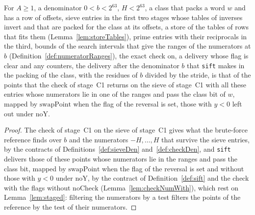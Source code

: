 \begin{lemma}\label{lem:sift_eq_checkDen}
  \leanok
  For $A \ge 1$, a denominator $0 < b < 2^{63}$, $H < 2^{63}$, a class that packs a word $w$ and has
  a row of offsets, sieve entries in the first two stages whose tables of inverses invert and that
  are packed for the class at its offsets, a store of the tables of rows that fits them
  (Lemma~\ref{lem:storeTables}), prime entries with their reciprocals in the third, bounds of the
  search intervals that give the ranges of the numerators at $b$
  (Definition~\ref{def:numeratorRanges}), the exact check on, a delivery whose flag is clear and any
  counters, the delivery after the denominator $b$ that \verb|sift| makes in the packing of the
  class, with the residues of $b$ divided by the stride, is that of the points that the check of
  stage~C1 returns on the sieve of stage~C1 with all these entries whose numerators lie in one of
  the ranges and pass the class bit of $w$, mapped by $\mathrm{swapPoint}$ when the flag of the
  reversal is set, those with $y < 0$ left out under $\mathrm{noY}$.
\end{lemma}

\begin{proof}
  \leanok
  The check of stage~C1 on the sieve of stage~C1 gives what the brute-force reference finds over $b$
  and the numerators $-H, \dots, H$ that survive the sieve entries, by the contracts of
  Definitions~\ref{def:sieveDen} and~\ref{def:checkDen}, and \verb|sift| delivers those of these
  points whose numerators lie in the ranges and pass the class bit, mapped by $\mathrm{swapPoint}$
  when the flag of the reversal is set and without those with $y < 0$ under $\mathrm{noY}$, by the
  contract of Definition~\ref{def:sift} and the check with the flags without $\mathrm{noCheck}$
  (Lemma~\ref{lem:checkNumWith}), which rest on Lemma~\ref{lem:staged}: filtering the numerators by
  a test filters the points of the reference by the test of their numerators.
\end{proof}

